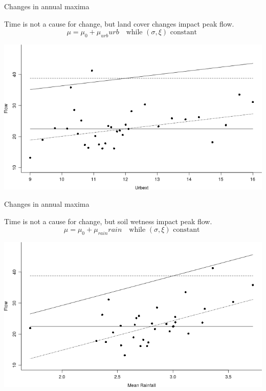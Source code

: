 \documentclass[
  10pt,
  ignorenonframetext,
  compress]{beamer}
\begin{document}
\begin{frame}{Changes in annual maxima}
\protect\hypertarget{changes-in-annual-maxima}{}

Time is not a cause for change, but land cover changes impact peak
flow.\\
\[\mu=\mu_0 + \mu_{urb} urb \quad \text{while } (\sigma, \xi)  \text{ constant }\]

\includegraphics{ProsdocimiPerugia_files/figure-beamer/urbextRetPlot-1.png}

\end{frame}

\begin{frame}{Changes in annual maxima}
\protect\hypertarget{changes-in-annual-maxima-1}{}

Time is not a cause for change, but soil wetness impact peak flow.\\
\[\mu=\mu_0 + \mu_{rain} rain \quad \text{while } (\sigma, \xi)  \text{ constant }\]

\includegraphics{ProsdocimiPerugia_files/figure-beamer/rainRetPlot-1.png}

\end{frame}
\end{document}
